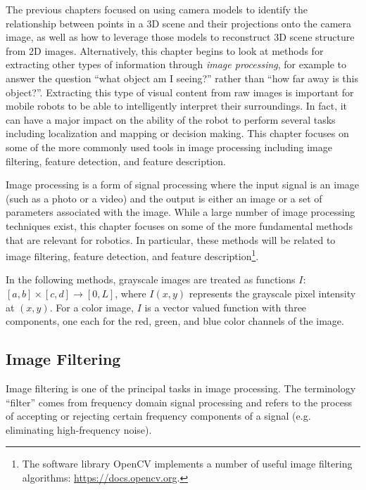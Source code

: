 The previous chapters focused on using camera models to identify the relationship between points in a 3D scene and their projections onto the camera image, as well as how to leverage those models to reconstruct 3D scene structure from 2D images. 
Alternatively, this chapter begins to look at methods for extracting other types of information through \textit{image processing}, for example to answer the question ``what object am I seeing?'' rather than ``how far away is this object?''.
Extracting this type of visual content from raw images is important for mobile robots to be able to intelligently interpret their surroundings. In fact, it can have a major impact on the ability of the robot to perform several tasks including localization and mapping or decision making. This chapter focuses on some of the more commonly used tools in image processing including image filtering, feature detection, and feature description\cite{SiegwartNourbakhshEtAl2011}\cite{Moravec1977}.

Image processing is a form of signal processing where the input signal is an image (such as a photo or a video) and the output is either an image or a set of parameters associated with the image. While a large number of image processing techniques exist, this chapter focuses on some of the more fundamental methods that are relevant for robotics. In particular, these methods will be related to image filtering, feature detection, and feature description\footnote{The software library OpenCV implements a number of useful image filtering algorithms: \url{https://docs.opencv.org}.}.

In the following methods, grayscale images are treated as functions $I$: $[a,b]\times[c,d] \rightarrow [0,L]$, where $I(x,y)$ represents the grayscale pixel intensity at $(x,y)$. 
For a color image, $I$ is a vector valued function with three components, one each for the red, green, and blue color channels of the image.

\subsection{Image Filtering}
Image filtering is one of the principal tasks in image processing. The terminology ``filter'' comes from frequency domain signal processing and refers to the process of accepting or rejecting certain frequency components of a signal (e.g. eliminating high-frequency noise).

